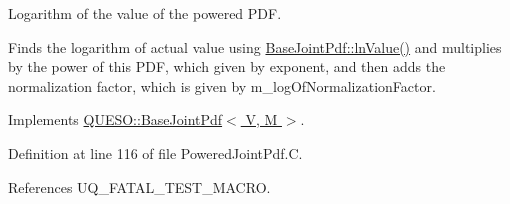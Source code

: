Logarithm of the value of the powered P\-D\-F. 

Finds the logarithm of actual value using \hyperlink{class_q_u_e_s_o_1_1_base_joint_pdf_aaeb1d91fd791399a502f451b07bb1bfe}{Base\-Joint\-Pdf\-::ln\-Value()} and multiplies by the power of {\ttfamily this} P\-D\-F, which given by {\ttfamily exponent}, and then adds the normalization factor, which is given by m\-\_\-log\-Of\-Normalization\-Factor. 

Implements \hyperlink{class_q_u_e_s_o_1_1_base_joint_pdf_aaeb1d91fd791399a502f451b07bb1bfe}{Q\-U\-E\-S\-O\-::\-Base\-Joint\-Pdf$<$ V, M $>$}.



Definition at line 116 of file Powered\-Joint\-Pdf.\-C.



References U\-Q\-\_\-\-F\-A\-T\-A\-L\-\_\-\-T\-E\-S\-T\-\_\-\-M\-A\-C\-R\-O.


